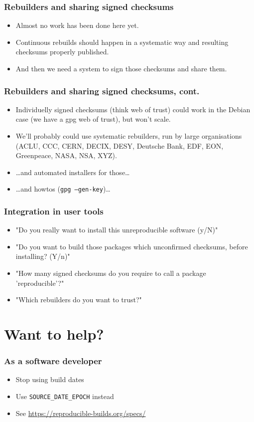 \documentclass[14pt]{beamer}
\begin{document}
\begin{frame}
 \frametitle{Rebuilders and sharing signed checksums}
 \begin{itemize}
  \item Almost no work has been done here yet.
  \item<2-3> Continuous rebuilds should happen in a systematic way and resulting
  checksums properly published.
  \item<3> And then we need a system to sign those checksums and share them. 
 \end{itemize}
\end{frame}

\begin{frame}
 \frametitle{Rebuilders and sharing signed checksums, cont.}
 \begin{itemize}
  \item Individuelly signed checksums (think web of trust) could work in the
  Debian case (we have a gpg web of trust), but won't scale.
  \item<2-4> { We'll probably could use systematic rebuilders, run by large organisations
  (ACLU, CCC, CERN, DECIX, DESY, Deutsche Bank, EDF, EON, Greenpeace, NASA, NSA, XYZ).}
  \item<3-4> { …and automated installers for those… }
  \item<4> { …and howtos (\texttt {gpg --gen-key})…}
 \end{itemize}
\end{frame}


\begin{frame}
 \frametitle{Integration in user tools}
 \begin{itemize}
  \item "Do you really want to install this unreproducible software (y/N)"
  \item<2-4> "Do you want to build those packages which unconfirmed checksums,
  before installing? (Y/n)"
  \item<3-4>{ "How many signed checksums do you require to call a package
  'reproducible'?"}
  \item<4>{ "Which rebuilders do you want to trust?"}
 \end{itemize}
\end{frame}

\section{Want to help?}

\begin{frame}
 \frametitle{As a software developer}
 \begin{itemize}
  \item Stop using build dates
  \item Use \texttt{SOURCE\_DATE\_EPOCH} instead
  \item See \url{https://reproducible-builds.org/specs/}
 \end{itemize}
\end{frame}
\end{document}

